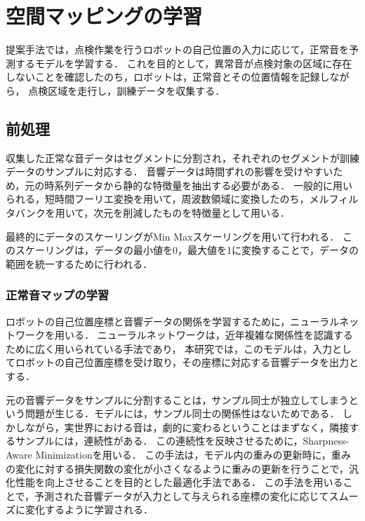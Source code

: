 \documentclass[../main]{subfiles}
\begin{document}
\section{空間マッピングの学習}

提案手法では，点検作業を行うロボットの自己位置の入力に応じて，正常音を予測するモデルを学習する．
これを目的として，異常音が点検対象の区域に存在しないことを確認したのち，ロボットは，正常音とその位置情報を記録しながら，
点検区域を走行し，訓練データを収集する．
\subsection{前処理}
収集した正常な音データはセグメントに分割され，それぞれのセグメントが訓練データのサンプルに対応する．
音響データは時間ずれの影響を受けやすいため，元の時系列データから静的な特徴量を抽出する必要がある．
一般的に用いられる，短時間フーリエ変換を用いて，周波数領域に変換したのち，メルフィルタバンクを用いて，次元を削減したものを特徴量として用いる．

最終的にデータのスケーリングがMin Maxスケーリングを用いて行われる．
このスケーリングは，データの最小値を0，最大値を1に変換することで，データの範囲を統一するために行われる．

\subsubsection{正常音マップの学習}
ロボットの自己位置座標と音響データの関係を学習するために，ニューラルネットワークを用いる．
ニューラルネットワークは，近年複雑な関係性を認識するために広く用いられている手法であり，
本研究では，このモデルは，入力としてロボットの自己位置座標を受け取り，その座標に対応する音響データを出力とする．

元の音響データをサンプルに分割することは，サンプル同士が独立してしまうという問題が生じる．モデルには，サンプル同士の関係性はないためである．
しかしながら，実世界における音は，劇的に変わるということはまずなく，隣接するサンプルには，連続性がある．
この連続性を反映させるために，Sharpness-Aware Minimizationを用いる．
この手法は，モデル内の重みの更新時に，重みの変化に対する損失関数の変化が小さくなるように重みの更新を行うことで，汎化性能を向上させることを目的とした最適化手法である．
この手法を用いることで，予測された音響データが入力として与えられる座標の変化に応じてスムーズに変化するように学習される．

\label{sec:pmethod_mapping}
\end{document}
